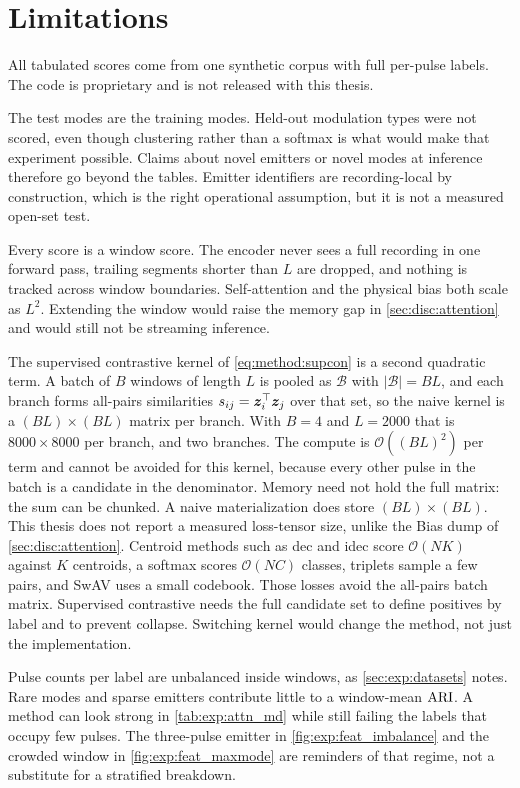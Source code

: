 \section{Limitations}\label{sec:disc:limitations}

All tabulated scores come from one synthetic corpus with full per-pulse labels.
The code is proprietary and is not released with this thesis.

The test modes are the training modes.
Held-out modulation types were not scored, even though clustering rather than a softmax is what would make that experiment possible.
Claims about novel emitters or novel modes at inference therefore go beyond the tables.
Emitter identifiers are recording-local by construction, which is the right operational assumption, but it is not a measured open-set test.

Every score is a window score.
The encoder never sees a full recording in one forward pass, trailing segments shorter than $L$ are dropped, and nothing is tracked across window boundaries.
Self-attention and the physical bias both scale as $L^{2}$. Extending the window would raise the memory gap in \cref{sec:disc:attention} and would still not be streaming inference.

The supervised contrastive kernel of \cref{eq:method:supcon} is a second quadratic term.
A batch of $B$ windows of length $L$ is pooled as $\mathcal{B}$ with $\lvert\mathcal{B}\rvert=BL$, and each branch forms all-pairs similarities $s_{ij}=\bm{z}_i^{\top}\bm{z}_j$ over that set, so the naive kernel is a $(BL)\times(BL)$ matrix per branch.
With $B=4$ and $L=2000$ that is $8000\times 8000$ per branch, and two branches.
The compute is $\mathcal{O}((BL)^{2})$ per term and cannot be avoided for this kernel, because every other pulse in the batch is a candidate in the denominator.
Memory need not hold the full matrix: the sum can be chunked.
A naive materialization does store $(BL)\times(BL)$.
This thesis does not report a measured loss-tensor size, unlike the Bias dump of \cref{sec:disc:attention}.
Centroid methods such as \gls{dec} and \gls{idec} score $\mathcal{O}(NK)$ against $K$ centroids, a softmax scores $\mathcal{O}(NC)$ classes, triplets sample a few pairs, and SwAV uses a small codebook.
Those losses avoid the all-pairs batch matrix.
Supervised contrastive needs the full candidate set to define positives by label and to prevent collapse.
Switching kernel would change the method, not just the implementation.

Pulse counts per label are unbalanced inside windows, as \cref{sec:exp:datasets} notes.
Rare modes and sparse emitters contribute little to a window-mean $\mathrm{ARI}$.
A method can look strong in \cref{tab:exp:attn_md} while still failing the labels that occupy few pulses.
The three-pulse emitter in \cref{fig:exp:feat_imbalance} and the crowded window in \cref{fig:exp:feat_maxmode} are reminders of that regime, not a substitute for a stratified breakdown.

